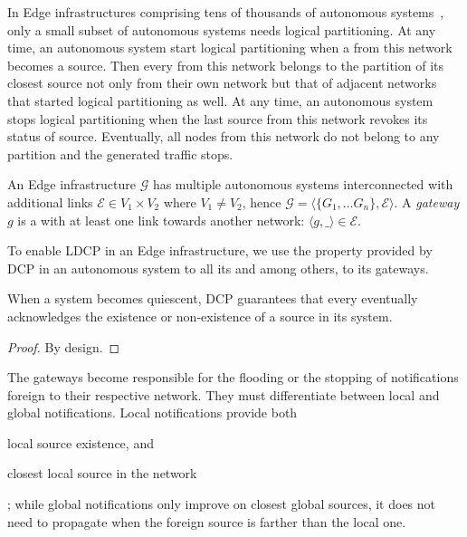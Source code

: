 In Edge infrastructures comprising tens of thousands of autonomous
systems~\cite{nur2018crossas}, only a small subset of autonomous
systems needs logical partitioning. At any time, an autonomous system
start logical partitioning when a \process from this network becomes a
source.  Then every \process from this network belongs to the
partition of its closest source not only from their own network but
that of adjacent networks that started logical partitioning as well.
At any time, an autonomous system stops logical partitioning when the
last source from this network revokes its status of
source. Eventually, all nodes from this network do not belong to any
partition and the generated traffic stops.

\begin{definition}
  An Edge infrastructure $\mathcal{G}$ has multiple autonomous systems
  interconnected with additional links $\mathcal{E} \in V_1 \times
  V_2$ where $V_1 \neq V_2$, hence $\mathcal{G} = \langle \{G_1,
  \ldots G_n\}, \mathcal{E} \rangle$. A \emph{gateway} $g$ is a
  \process with at least one link towards another network: $\langle g,
  \_ \rangle \in \mathcal{E}$.
\end{definition}

\begin{definition}
\end{definition}

To enable LDCP in an Edge infrastructure, we use the property provided
by DCP in an autonomous system to all its \processes and among others,
to its gateways.

\begin{lemma}
  When a system becomes quiescent, DCP guarantees that every \process
  eventually acknowledges the existence or non-existence of a source
  in its system.
\end{lemma}

\begin{proof}
  By design.
\end{proof}

The gateways become responsible for the flooding or the stopping of
notifications foreign to their respective network. They must
differentiate between local and global notifications. Local
notifications provide both \begin{inparaenum}[(i)]
\item local source existence, and
\item closest local source in the network
\end{inparaenum}; while global notifications only improve on closest global sources,
\ie it does not need to propagate when the foreign source is farther
than the local one.


